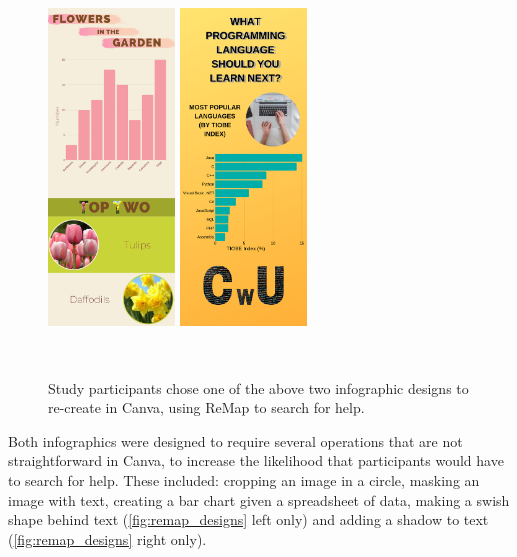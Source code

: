 \begin{figure}[t!]
\centering
  \includegraphics[width=0.3\textwidth]{remap/figures/designA.png}
  \hspace{0.2in}
  \includegraphics[width=0.3\textwidth]{remap/figures/designB.png}
  \caption{Study participants chose one of the above two infographic designs to re-create in Canva, using ReMap to search for help.}~\label{fig:remap_designs}
\end{figure}

Both infographics were designed to require several operations that are not straightforward in Canva, to increase the likelihood that participants would have to search for help. These included: cropping an image in a circle, masking an image with text, creating a bar chart given a spreadsheet of data, making a swish shape behind text (\autoref{fig:remap_designs} left only) and adding a shadow to text (\autoref{fig:remap_designs} right only).

